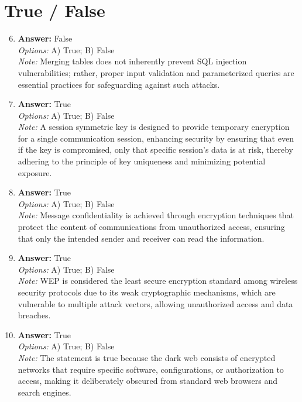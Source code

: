 \documentclass[12pt]{article}
\begin{document}
\section*{True / False}
\begin{enumerate}[label=\arabic*.]
\setcounter{enumi}{5}
\item \textbf{Answer:} False
\\ \textit{Options:} A) True; B) False
\\ \textit{Note:} Merging tables does not inherently prevent SQL injection vulnerabilities; rather, proper input validation and parameterized queries are essential practices for safeguarding against such attacks.
\item \textbf{Answer:} True
\\ \textit{Options:} A) True; B) False
\\ \textit{Note:} A session symmetric key is designed to provide temporary encryption for a single communication session, enhancing security by ensuring that even if the key is compromised, only that specific session's data is at risk, thereby adhering to the principle of key uniqueness and minimizing potential exposure.
\item \textbf{Answer:} True
\\ \textit{Options:} A) True; B) False
\\ \textit{Note:} Message confidentiality is achieved through encryption techniques that protect the content of communications from unauthorized access, ensuring that only the intended sender and receiver can read the information.
\item \textbf{Answer:} True
\\ \textit{Options:} A) True; B) False
\\ \textit{Note:} WEP is considered the least secure encryption standard among wireless security protocols due to its weak cryptographic mechanisms, which are vulnerable to multiple attack vectors, allowing unauthorized access and data breaches.
\item \textbf{Answer:} True
\\ \textit{Options:} A) True; B) False
\\ \textit{Note:} The statement is true because the dark web consists of encrypted networks that require specific software, configurations, or authorization to access, making it deliberately obscured from standard web browsers and search engines.
\end{enumerate}
\end{document}
